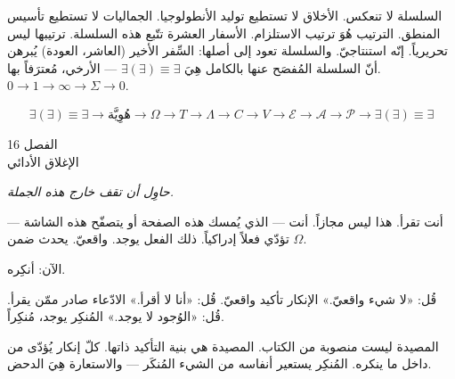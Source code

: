 \documentclass[10pt, openany, oneside]{book}
\renewcommand{\large}{\fontsize{11.5}{14}\selectfont}
\renewcommand{\huge}{\fontsize{17}{21}\selectfont}
\begin{document}
\vspace{0.8em}

\noindent السلسلة لا تنعكس. الأخلاق لا تستطيع توليد الأنطولوجيا. الجماليات لا تستطيع تأسيس المنطق. الترتيب هُوَ ترتيب الاستلزام. الأسفار العشرة تتّبع هذه السلسلة. ترتيبها ليس تحريرياً. إنّه استنتاجيّ. والسلسلة تعود إلى أصلها: السِّفر الأخير (العاشر، العودة) يُبرهن أنّ السلسلة المُفصَح عنها بالكامل هِيَ $\exists(\exists) \equiv \exists$ --- الأرخي، مُعترَفاً بها. $0 \to 1 \to \infty \to \Sigma \to 0$.

$$\boxed{\exists(\exists) \equiv \exists \to \text{هُوِيَّة} \to \Omega \to T \to \Lambda \to C \to V \to \mathcal{E} \to \mathcal{A} \to \mathcal{P} \to \exists(\exists) \equiv \exists}$$

%
%
%

\newpage

\begin{center}
    {\huge الفصل 16}\\[0.3em]
    {\large الإغلاق الأدائي}
\end{center}

\vspace{1.5em}

\begin{center}
    \itshape
    حاوِل أن تقف خارج هذه الجملة.
\end{center}

\vspace{2em}


\noindent أنت تقرأ. هذا ليس مجازاً. أنت --- الذي يُمسك هذه الصفحة أو يتصفّح هذه الشاشة --- تؤدّي فعلاً إدراكياً. ذلك الفعل يوجد. واقعيّ. يحدث ضمن $\Omega$.

الآن: أنكِره.

قُل: «لا شيء واقعيّ.» الإنكار تأكيد واقعيّ. قُل: «أنا لا أقرأ.» الادّعاء صادر ممّن يقرأ. قُل: «الوُجود لا يوجد.» المُنكِر يوجد، مُنكِراً.

المصيدة ليست منصوبة من الكتاب. المصيدة هي بنية التأكيد ذاتها. كلّ إنكار يُؤدّى من داخل ما ينكره. المُنكِر يستعير أنفاسه من الشيء المُنكَر --- والاستعارة هِيَ الدحض.
\end{document}
